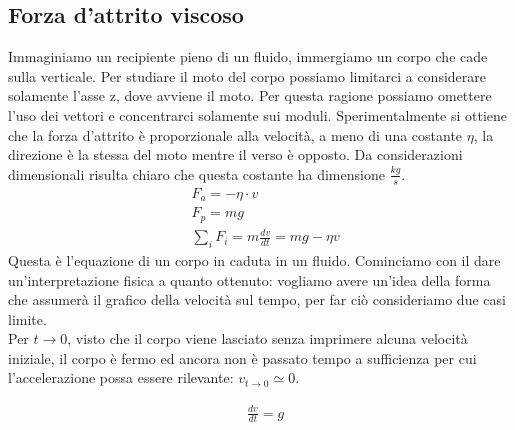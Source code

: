 \subsection{Forza d'attrito viscoso}
Immaginiamo un recipiente pieno di un fluido, immergiamo un corpo che cade sulla verticale. Per studiare il moto del corpo possiamo limitarci a considerare solamente l'asse z, dove avviene il moto. Per questa ragione possiamo omettere l'uso dei vettori e concentrarci solamente sui moduli. Sperimentalmente si ottiene che la forza d'attrito è proporzionale alla velocità, a meno di una costante $\eta$, la direzione è la stessa del moto mentre il verso è opposto. Da considerazioni dimensionali risulta chiaro che questa costante ha dimensione $\frac{kg}{s}$.
\begin{align*}
&F_a=-\eta\cdot v\\
&F_p=mg\\
&\sum_{i}F_i=m\frac{dv}{dt}=mg-\eta v
\end{align*}
Questa è l'equazione di un corpo in caduta in un fluido. Cominciamo con il dare un'interpretazione fisica a quanto ottenuto: vogliamo avere un'idea della forma che assumerà il grafico della velocità sul tempo, per far ciò consideriamo due casi limite.\\
Per $t\rightarrow 0$, visto che il corpo viene lasciato senza imprimere alcuna velocità iniziale, il corpo è fermo ed ancora non è passato tempo a sufficienza per cui l'accelerazione possa essere rilevante: $v_{t\rightarrow 0} \simeq 0$.

\begin{align*}
&\frac{dv}{dt}=g
\end{align*}

